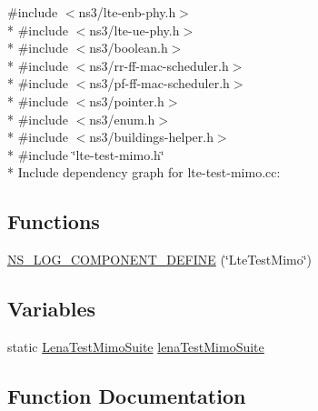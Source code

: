 {\ttfamily \#include $<$ns3/lte-\/enb-\/phy.\+h$>$}\\*
{\ttfamily \#include $<$ns3/lte-\/ue-\/phy.\+h$>$}\\*
{\ttfamily \#include $<$ns3/boolean.\+h$>$}\\*
{\ttfamily \#include $<$ns3/rr-\/ff-\/mac-\/scheduler.\+h$>$}\\*
{\ttfamily \#include $<$ns3/pf-\/ff-\/mac-\/scheduler.\+h$>$}\\*
{\ttfamily \#include $<$ns3/pointer.\+h$>$}\\*
{\ttfamily \#include $<$ns3/enum.\+h$>$}\\*
{\ttfamily \#include $<$ns3/buildings-\/helper.\+h$>$}\\*
{\ttfamily \#include \char`\"{}lte-\/test-\/mimo.\+h\char`\"{}}\\*
Include dependency graph for lte-\/test-\/mimo.cc\+:
\subsection*{Functions}
\begin{DoxyCompactItemize}
\item 
\hyperlink{lte-test-mimo_8cc_a68aa924380a675349db23038aed09f55}{N\+S\+\_\+\+L\+O\+G\+\_\+\+C\+O\+M\+P\+O\+N\+E\+N\+T\+\_\+\+D\+E\+F\+I\+NE} (\char`\"{}Lte\+Test\+Mimo\char`\"{})
\end{DoxyCompactItemize}
\subsection*{Variables}
\begin{DoxyCompactItemize}
\item 
static \hyperlink{classLenaTestMimoSuite}{Lena\+Test\+Mimo\+Suite} \hyperlink{lte-test-mimo_8cc_a6b40c4198e1c315641ea11b7efeb7c1e}{lena\+Test\+Mimo\+Suite}
\end{DoxyCompactItemize}


\subsection{Function Documentation}
